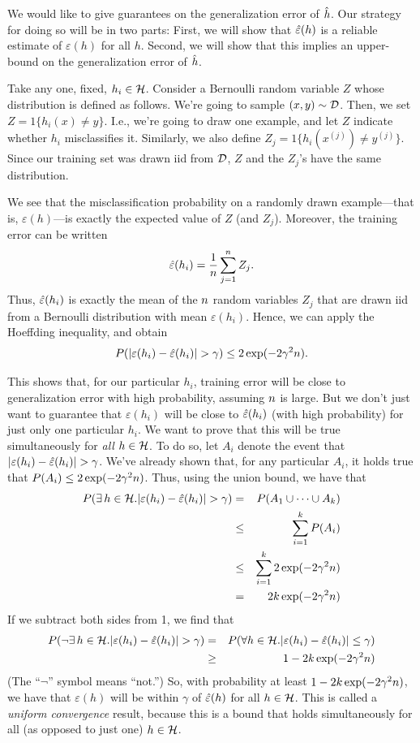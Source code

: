 \documentclass{article} %
\begin{document}
We would like to give guarantees on the generalization error of $\hat{h}$.
Our strategy for doing so will be in two parts: First, we will show that $\hat\varepsilon(h)$ is
a reliable estimate of $\varepsilon(h)$ for all $h$.  Second, we will show that
this implies an upper-bound on the generalization error of $\hat{h}$.

Take any one, fixed, $h_i \in {\cal H}$.  Consider a Bernoulli random variable $Z$ whose
distribution is defined as follows.  We're going to sample $(x, y) \sim {\cal D}$.
Then, we set $Z = 1\{h_i(x) \neq y\}$.  I.e., we're going to draw one example,
and let $Z$ indicate whether $h_i$ misclassifies it.  Similarly, we also
define $Z_j = 1\{h_i(x^{(j)}) \neq y^{(j)}\}$.  Since our training set was drawn iid from ${\cal D}$,
$Z$ and the $Z_j$'s have the same distribution.

We see that the misclassification probability on a randomly drawn
example---that is, $\varepsilon(h)$---is exactly the expected value
of $Z$ (and $Z_j$).  Moreover, the training error can be written
\[
\hat\varepsilon(h_i) = \frac{1}{{n}} \sum_{j=1}^{n} Z_j.
\]
Thus, $\hat\varepsilon(h_i)$ is exactly the mean of the ${n}$ random variables $Z_j$ that are
drawn iid from a Bernoulli distribution with mean $\varepsilon(h_i)$.
Hence, we can apply the Hoeffding inequality, and obtain
\[
P(|\varepsilon(h_i) - \hat\varepsilon(h_i)| > \gamma) \leq 2\exp(-2\gamma^2{n}).
\]

This shows that, for our particular $h_i$, training error will be close
to generalization error with high probability, assuming ${n}$ is large.
But we don't just want to guarantee that $\varepsilon(h_i)$ will be close to $\hat\varepsilon(h_i)$ (with
high probability) for just only one particular $h_i$.  We want to prove that this will be true
simultaneously for \emph{all} $h \in {\cal H}$.  To do so, let $A_i$ denote the event that
$|\varepsilon(h_i) - \hat\varepsilon(h_i)| > \gamma$.  We've already shown that, for any particular $A_i$,
it holds true that $P(A_i) \leq 2\exp(-2\gamma^2{n})$.  Thus, using the union bound, we have
that
\begin{eqnarray*}
P(\exists\, h \in {\cal H}. |\varepsilon(h_i) - \hat\varepsilon(h_i)| > \gamma)
&=& P(A_1 \cup \cdots \cup A_k) \\
&\leq& \sum_{i=1}^k P(A_i) \\
&\leq& \sum_{i=1}^k 2\exp(-2\gamma^2{n})\\
&=& 2k\exp(-2\gamma^2{n})
\end{eqnarray*}
If we subtract both sides from 1, we find that
\begin{eqnarray*}
P(\neg \exists\, h \in {\cal H}. |\varepsilon(h_i) - \hat\varepsilon(h_i)| > \gamma)
&=& P(\forall h \in {\cal H}. |\varepsilon(h_i) - \hat\varepsilon(h_i)| \leq \gamma) \\
&\geq& 1-2k\exp(-2\gamma^2{n})
\end{eqnarray*}
(The ``$\neg$'' symbol means ``not.'') So, with probability
at least $1-2k\exp(-2\gamma^2{n})$, we have that
$\varepsilon(h)$ will be within $\gamma$ of $\hat\varepsilon(h)$ for all $h \in {\cal H}$.  This is
called a \emph{uniform convergence} result, because this is a bound that holds
simultaneously for all (as opposed to just one) $h \in {\cal H}$.
\end{document}
